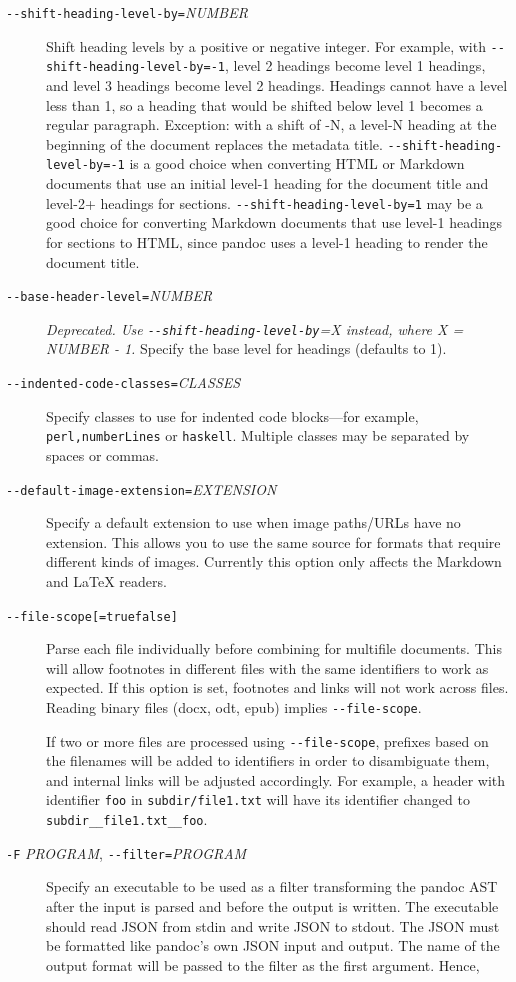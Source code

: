 \documentclass[
  b5paper
]{book}
\begin{document}
\begin{description}
\item[\texttt{-\/-shift-heading-level-by=}\emph{NUMBER}]
Shift heading levels by a positive or negative integer. For example,
with \texttt{-\/-shift-heading-level-by=-1}, level 2 headings become
level 1 headings, and level 3 headings become level 2 headings. Headings
cannot have a level less than 1, so a heading that would be shifted
below level 1 becomes a regular paragraph. Exception: with a shift of
-N, a level-N heading at the beginning of the document replaces the
metadata title. \texttt{-\/-shift-heading-level-by=-1} is a good choice
when converting HTML or Markdown documents that use an initial level-1
heading for the document title and level-2+ headings for sections.
\texttt{-\/-shift-heading-level-by=1} may be a good choice for
converting Markdown documents that use level-1 headings for sections to
HTML, since pandoc uses a level-1 heading to render the document title.
\item[\texttt{-\/-base-header-level=}\emph{NUMBER}]
\emph{Deprecated. Use \texttt{-\/-shift-heading-level-by}=X instead,
where X = NUMBER - 1.} Specify the base level for headings (defaults to
1).
\item[\texttt{-\/-indented-code-classes=}\emph{CLASSES}]
Specify classes to use for indented code blocks---for example,
\texttt{perl,numberLines} or \texttt{haskell}. Multiple classes may be
separated by spaces or commas.
\item[\texttt{-\/-default-image-extension=}\emph{EXTENSION}]
Specify a default extension to use when image paths/URLs have no
extension. This allows you to use the same source for formats that
require different kinds of images. Currently this option only affects
the Markdown and LaTeX readers.
\item[\texttt{-\/-file-scope{[}=true\textbar{}false{]}}]
Parse each file individually before combining for multifile documents.
This will allow footnotes in different files with the same identifiers
to work as expected. If this option is set, footnotes and links will not
work across files. Reading binary files (docx, odt, epub) implies
\texttt{-\/-file-scope}.

If two or more files are processed using \texttt{-\/-file-scope},
prefixes based on the filenames will be added to identifiers in order to
disambiguate them, and internal links will be adjusted accordingly. For
example, a header with identifier \texttt{foo} in
\texttt{subdir/file1.txt} will have its identifier changed to
\texttt{subdir\_\_file1.txt\_\_foo}.
\item[\texttt{-F} \emph{PROGRAM}, \texttt{-\/-filter=}\emph{PROGRAM}]
Specify an executable to be used as a filter transforming the pandoc AST
after the input is parsed and before the output is written. The
executable should read JSON from stdin and write JSON to stdout. The
JSON must be formatted like pandoc's own JSON input and output. The name
of the output format will be passed to the filter as the first argument.
Hence,


\end{description}
\end{document}
